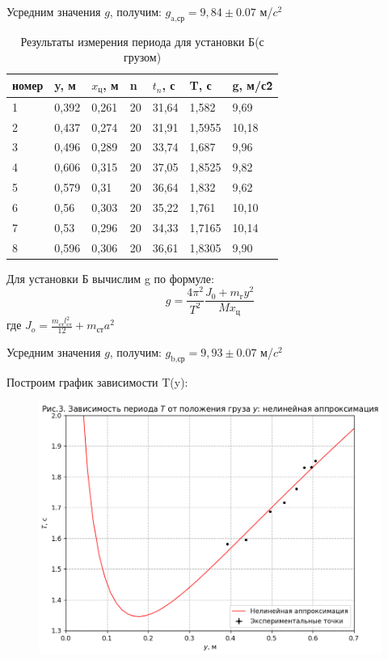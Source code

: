 \documentclass[a4paper,12pt]{article}
\begin{document}
Усредним значения $g$, получим: $g_{\mbox{a,ср}} = 9,84 \pm 0.07$ м/$c^2$


\begin{table}[H]
\centering
\caption{Результаты измерения периода для установки Б(с грузом)}
\begin{tabular}{|l|l|l|l|l|l|l|}
\hline
номер & y, м & $x_{\mbox{ц}}$, м & n & $t_n$, с & T, с & g, м/с\^2 \\ \hline
1 & 0,392 & 0,261 & 20 & 31,64 & 1,582 & 9,69\\ \hline
2 & 0,437 & 0,274 & 20 & 31,91 & 1,5955 & 10,18 \\ \hline
3 & 0,496 & 0,289 & 20 & 33,74 & 1,687 & 9,96 \\ \hline
4 & 0,606 & 0,315 & 20 & 37,05 & 1,8525 & 9,82 \\ \hline
5 & 0,579 & 0,31 & 20 & 36,64 & 1,832 & 9,62 \\ \hline
6 & 0,56 & 0,303 & 20 & 35,22 & 1,761 & 10,10 \\ \hline
7 & 0,53 & 0,296 & 20 & 34,33 & 1,7165 & 10,14 \\ \hline
8 & 0,596 & 0,306 & 20 & 36,61 & 1,8305 & 9,90 \\ \hline
\end{tabular}
\end{table}

Для установки Б вычислим g по формуле:
\begin{equation}
g = \frac{4\pi^{2}}{T^2} \frac{J_0 + m_{\mbox{г}}y^2}{Mx_{\mbox{ц}}}
\end{equation}
где $J_o = \frac{m_{\mbox{ст}}l_{\mbox{ст}}^2}{12} + m_{\mbox{ст}}a^2$

Усредним значения $g$, получим: $g_{\mbox{b,ср}} = 9,93\pm 0.07$ м/$c^2$

Построим график зависимости T(y):
\begin{figure}[H]
\begin{center}
\includegraphics[width=1\textwidth]{T(a)}
\end{center}
\end{figure}
\end{document}
